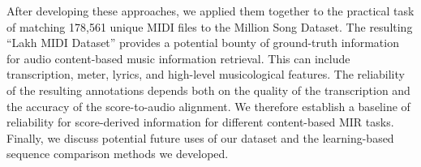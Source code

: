 After developing these approaches, we applied them together to the practical task of matching 178,561 unique MIDI files to the Million Song Dataset.
The resulting ``Lakh MIDI Dataset'' provides a potential bounty of ground-truth information for audio content-based music information retrieval.
This can include transcription, meter, lyrics, and high-level musicological features.
The reliability of the resulting annotations depends both on the quality of the transcription and the accuracy of the score-to-audio alignment.
We therefore establish a baseline of reliability for score-derived information for different content-based MIR tasks.
Finally, we discuss potential future uses of our dataset and the learning-based sequence comparison methods we developed.
